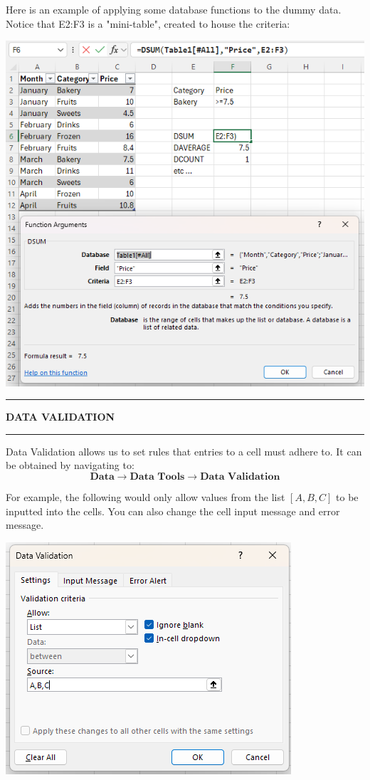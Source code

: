 \documentclass[8pt]{extarticle}
\newcommand{\heading}[1]{%
    \noindent
    \rule{\linewidth}{0.4pt}
    \begin{center}
        \vspace{-1ex}
        \textbf{#1}        
        \vspace{-2.5ex}
    \end{center}
    \rule{\linewidth}{0.4pt}
}
\begin{document}
\begin{multicols}{3}
Here is an example of applying some database functions to the dummy data. Notice that E2:F3 is a "mini-table", created to house the criteria:

\begin{center}
    \includegraphics[width=0.98\columnwidth]{images/DFunctions.png}
\end{center}

\heading{DATA VALIDATION}

Data Validation allows us to set rules that entries to a cell must adhere to. It can be obtained by navigating to:
\[ \textbf{Data} \rightarrow \textbf{Data Tools} \rightarrow \textbf{Data Validation} \]

For example, the following would only allow values from the list $[A,B,C]$ to be inputted into the cells. You can also change the cell input message and error message.

\begin{center}
    \includegraphics[width = 0.7\columnwidth]{images/DataValidation.png}
\end{center}


\end{multicols}
\end{document}
